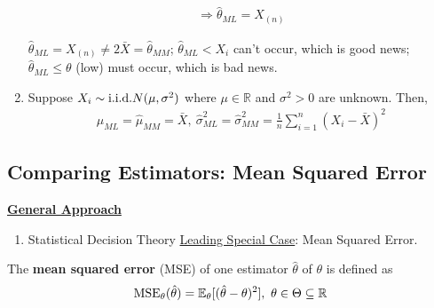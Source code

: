 \documentclass[11pt]{elegantbook}
\begin{document}
\begin{example}
\begin{enumerate}
\begin{equation}
\begin{aligned}
            \Rightarrow \hat{\theta}_{ML}=X_{(n)}
        \end{aligned}
        \nonumber
    \end{equation}
    \begin{remark}
        $\hat{\theta}_{ML}=X_{(n)}\neq 2\bar{X}=\hat{\theta}_{MM}$; $\hat{\theta}_{ML}<X_i$ can't occur, which is good news; $\hat{\theta}_{ML}\leq \theta$ (low) must occur, which is bad news.
    \end{remark}
    \item Suppose $X_i\sim \textnormal{i.i.d.}N(\mu,\sigma^2)$ where $\mu\in \mathbb{R}$ and $\sigma^2>0$ are unknown. Then,
    \begin{equation}
        \begin{aligned}
            \hat{\mu}_{ML}=\hat{\mu}_{MM}=\bar{X},\ \hat{\sigma}^2_{ML}=\hat{\sigma}^2_{MM}=\frac{1}{n}\sum_{i=1}^n (X_i-\bar{X})^2
        \end{aligned}
        \nonumber
    \end{equation}
\end{enumerate}
\end{example}

\subsection{Comparing Estimators: Mean Squared Error}
\textbf{\underline{General Approach}}
\begin{enumerate}[$\circ$]
    \item Statistical Decision Theory
    \subitem \underline{Leading Special Case}: Mean Squared Error.
\end{enumerate}

\begin{definition}
    \normalfont
    The \textbf{mean squared error} (MSE) of one estimator $\hat{\theta}$ of $\theta$ is defined as
    \begin{equation}
        \begin{aligned}
            \textnormal{MSE}_\theta(\hat{\theta})=\mathbb{E}_\theta[(\hat{\theta}-\theta)^2],\ \theta\in \Theta\subseteq \mathbb{R}
        \end{aligned}
        \nonumber
    \end{equation}
\end{definition}
\end{document}
